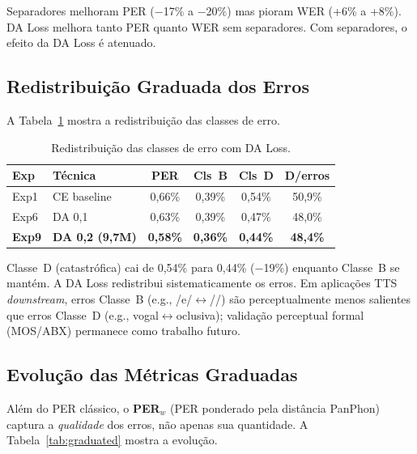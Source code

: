 \documentclass[12pt]{article}
\newcommand{\ipaE}{\textipa{E}}%
\begin{document}
Separadores melhoram PER ($-$17\% a $-$20\%) mas pioram WER (+6\% a
+8\%). DA Loss melhora tanto PER quanto WER sem separadores. Com
separadores, o efeito da DA Loss \'e atenuado.

\subsection{Redistribui\c{c}\~ao Graduada dos Erros}

A Tabela~\ref{tab:classes} mostra a redistribui\c{c}\~ao das classes de
erro.

\begin{table}[ht]
\centering
\caption{Redistribui\c{c}\~ao das classes de erro com DA Loss.}
\label{tab:classes}
\begin{tabular}{llcccc}
\toprule
\textbf{Exp} & \textbf{T\'ecnica} & \textbf{PER}
  & \textbf{Cls~B} & \textbf{Cls~D} & \textbf{D/erros} \\
\midrule
Exp1 & CE baseline  & 0,66\% & 0,39\% & 0,54\% & 50,9\% \\
Exp6 & DA 0,1       & 0,63\% & 0,39\% & 0,47\% & 48,0\% \\
\textbf{Exp9} & \textbf{DA 0,2 (9,7M)} & \textbf{0,58\%}
  & \textbf{0,36\%} & \textbf{0,44\%} & \textbf{48,4\%} \\
\bottomrule
\end{tabular}
\end{table}

Classe~D (catastr\'ofica) cai de 0,54\% para 0,44\% ($-$19\%) enquanto
Classe~B se mant\'em. A DA Loss redistribui sistematicamente os erros.
Em aplica\c{c}\~oes TTS \emph{downstream}, erros Classe~B
(e.g., /e/$\leftrightarrow$/\ipaE{}/) s\~ao perceptualmente menos
salientes que erros Classe~D (e.g., vogal$\leftrightarrow$oclusiva);
valida\c{c}\~ao perceptual formal (MOS/ABX) permanece como trabalho
futuro.

\subsection{Evolu\c{c}\~ao das M\'etricas Graduadas}

Al\'em do PER cl\'assico, o \textbf{PER$_w$} (PER ponderado pela
dist\^ancia PanPhon) captura a \emph{qualidade} dos erros, n\~ao
apenas sua quantidade. A Tabela~\ref{tab:graduated} mostra a
evolu\c{c}\~ao.
\end{document}
